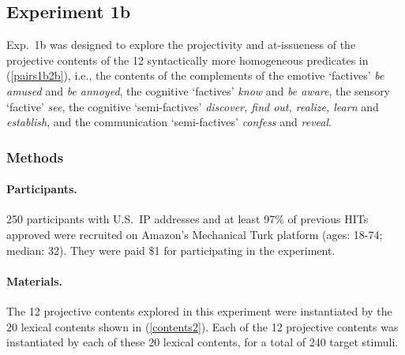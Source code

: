 \documentclass[11pt,fleqn]{article}
\newcommand{\6}{\mbox{$[\hspace*{-.6mm}[$}}
\newcommand{\9}{\mbox{$]\hspace*{-.6mm}]$}}
\begin{document}
\subsection{Experiment 1b}\label{s-exp1b} 

Exp.~1b was designed to explore the projectivity and at-issueness of the projective contents of the 12 syntactically more homogeneous predicates in (\ref{pairs1b2b}), i.e., the contents of the complements of the emotive `factives' {\em be amused} and {\em be annoyed}, the cognitive `factives' {\em know} and {\em be aware}, the sensory `factive' {\em see}, the cognitive `semi-factives' {\em discover, find out, realize, learn} and {\em establish}, and the communication `semi-factives' {\em confess} and {\em reveal}.


\subsubsection{Methods}

\paragraph{Participants.} 250 participants with U.S.\ IP addresses and at least 97\% of previous HITs approved were recruited on Amazon's Mechanical Turk platform (ages: 18-74; median: 32). They were paid \$1 for participating in the experiment.

\paragraph{Materials.} The 12 projective contents explored in this experiment were instantiated by the 20 lexical contents shown in (\ref{contents2}). Each of the 12 projective contents was instantiated by each of these 20 lexical contents, for a total of 240 target stimuli. 
\end{document}
